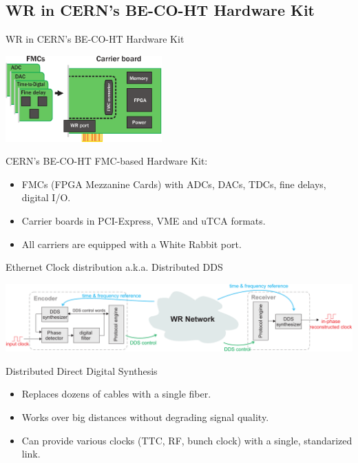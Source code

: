 \documentclass[compress,red]{beamer}
\begin{document}
\subsection{WR in CERN's BE-CO-HT Hardware Kit}
\begin{frame}{WR in CERN's BE-CO-HT Hardware Kit}
\begin{center}

  \includegraphics[width=6cm]{node/shw_kit}

  \begin{block}{CERN's BE-CO-HT FMC-based Hardware Kit:}
    \begin{itemize}
    \item FMCs (FPGA Mezzanine Cards) with ADCs, DACs, TDCs, fine delays, digital I/O.
    \item Carrier boards in PCI-Express, VME and uTCA formats.
    \item All carriers are equipped with a White Rabbit port.
    \end{itemize}
  \end{block}

\end{center}
\end{frame}


\begin{frame}{Ethernet Clock distribution a.k.a. Distributed DDS}
  \begin{center}
    \includegraphics[width=\columnwidth]{applications/remote_dds.pdf}
  \end{center}
  \begin{block}{Distributed Direct Digital Synthesis}
    \begin{itemize}
    \item Replaces dozens of cables with a single fiber.
    \item Works over big distances without degrading signal quality.
    \item Can provide various clocks (TTC, RF, bunch clock) with a single, standarized link.
    \end{itemize}
  \end{block}
\end{frame}
\end{document}
